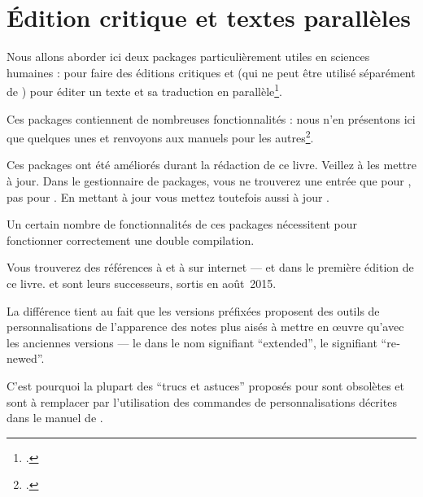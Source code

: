 \chapter{Édition critique et textes parallèles}  \label{reledmac}


\begin{intro}
Nous allons aborder ici deux packages particulièrement utiles en sciences humaines :  pour faire des éditions critiques et  (qui ne peut être utilisé séparément de ) pour éditer un texte et sa traduction en parallèle\footcite[Il existe un livre d'introduction aux éditions critiques avec \XeLaTeX :][]{leal2012}.

Ces packages contiennent de nombreuses fonctionnalités : nous n'en présentons ici que quelques unes et renvoyons aux manuels pour les autres\footcites{reledmac}{reledpar}. 
\end{intro}

\begin{attention}
Ces packages ont été améliorés durant la rédaction de ce livre. Veillez à les mettre à jour.
Dans le gestionnaire de packages, vous ne trouverez une entrée que pour  ,  pas pour .  En mettant à jour  vous mettez toutefois aussi à jour  .
\end{attention}

\begin{attention}
Un certain nombre de fonctionnalités de ces packages nécessitent pour fonctionner correctement une double compilation.
\end{attention}

\begin{plusloins}
Vous trouverez des références à  et à  sur internet --- et dans le première édition de ce livre.
 et  sont leurs successeurs, sortis en août~2015.

La différence tient au fait que les versions préfixées proposent des outils de personnalisations de l'apparence des notes plus aisés à mettre en œuvre qu'avec les anciennes versions --- le  dans le nom signifiant \enquote{\textenglish{extended}}, le  signifiant \enquote{\textenglish{renewed}}. 

C'est pourquoi la plupart des \enquote{trucs et astuces} proposés pour  sont obsolètes et sont à remplacer par l'utilisation des commandes de personnalisations décrites dans le manuel de .
\end{plusloins}

